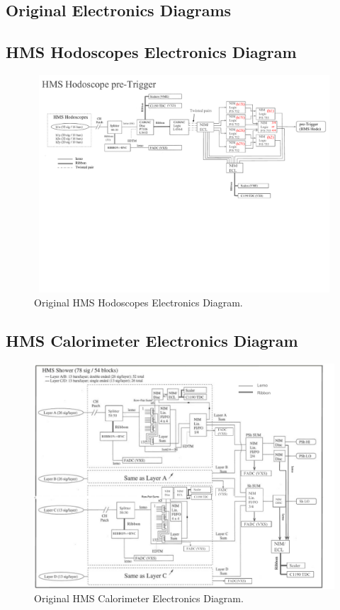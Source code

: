 \documentclass[11pt]{article}
\begin{document}
\newpage
\begin{appendices}
\appendix
\section{Original Electronics Diagrams}
\subsection{HMS Hodoscopes Electronics Diagram}
\label{appendix:AppxA1}
\begin{figure}[h!]
  \centering
  \includegraphics[width=7.0in, height=3.2in]{../HMS_HODO_TRIGGER.pdf}
  \caption{Original HMS Hodoscopes Electronics Diagram.}
  \label{fig:hms_hod_trg}
\end{figure}
\subsection{HMS Calorimeter Electronics Diagram}
\label{appendix:AppxA2}
\begin{figure}[h!]
  \centering
  \includegraphics[width=6.in, height=4.in]{../HMS_Cal_Trigger.pdf}
  \caption{Original HMS Calorimeter Electronics Diagram.}
  \label{fig:hms_cal_trg}
\end{figure}


\end{appendices}
\end{document}
